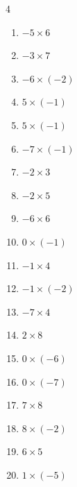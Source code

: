 \begin{multicols}{4}
\begin{enumerate}
  \item $-5\times 6$
        \phantom{$=-30$}

  \item $-3\times 7$
        \phantom{$=-21$}

  \item $-6\times (-2)$
        \phantom{$=12$}

  \item $5\times (-1)$
        \phantom{$=-5$}

  \item $5\times (-1)$
        \phantom{$=-5$}

  \item $-7\times (-1)$
        \phantom{$=7$}

\columnbreak %

  \item $-2\times 3$
        \phantom{$=-6$}

  \item $-2\times 5$
        \phantom{$=-10$}

  \item $-6\times 6$
        \phantom{$=-36$}

  \item $0\times (-1)$
        \phantom{$=0$}

  \item $-1\times 4$
        \phantom{$=-4$}

  \item $-1\times (-2)$
        \phantom{$=2$}

  \item $-7\times 4$
        \phantom{$=-28$}

  \item $2\times 8$
        \phantom{$=16$}

  \item $0\times (-6)$
        \phantom{$=0$}

  \item $0\times (-7)$
        \phantom{$=0$}

  \item $7\times 8$
        \phantom{$=56$}

  \item $8\times (-2)$
        \phantom{$=-16$}

  \item $6\times 5$
        \phantom{$=30$}

  \item $1\times (-5)$
        \phantom{$=-5$}


\end{enumerate}
\end{multicols}
